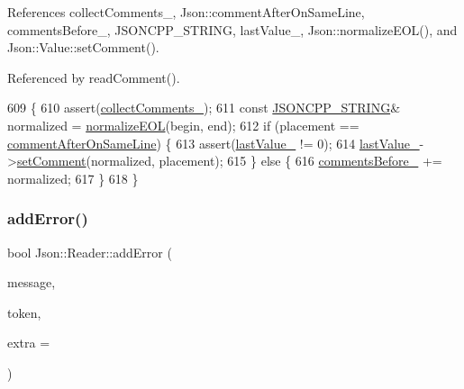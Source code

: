 References collect\+Comments\+\_\+, Json\+::comment\+After\+On\+Same\+Line, comments\+Before\+\_\+, J\+S\+O\+N\+C\+P\+P\+\_\+\+S\+T\+R\+I\+NG, last\+Value\+\_\+, Json\+::normalize\+E\+O\+L(), and Json\+::\+Value\+::set\+Comment().



Referenced by read\+Comment().


\begin{DoxyCode}
609                                                                            \{
610   assert(\hyperlink{class_json_1_1_reader_a8e9ce743f6004f0596692f0a9ee4626c}{collectComments\_});
611   \textcolor{keyword}{const} \hyperlink{json_8h_a1e723f95759de062585bc4a8fd3fa4be}{JSONCPP\_STRING}& normalized = \hyperlink{namespace_json_a63123f3dd63f340ac517a59f44ea7aa4}{normalizeEOL}(begin, end);
612   \textcolor{keywordflow}{if} (placement == \hyperlink{namespace_json_a4fc417c23905b2ae9e2c47d197a45351a008a230a0586de54f30b76afe70fdcfa}{commentAfterOnSameLine}) \{
613     assert(\hyperlink{class_json_1_1_reader_a87cc75ae5adc6a6755f0ba1c7255ff6c}{lastValue\_} != 0);
614     \hyperlink{class_json_1_1_reader_a87cc75ae5adc6a6755f0ba1c7255ff6c}{lastValue\_}->\hyperlink{class_json_1_1_value_a29f3a30f7e5d3af6f38d57999bf5b480}{setComment}(normalized, placement);
615   \} \textcolor{keywordflow}{else} \{
616     \hyperlink{class_json_1_1_reader_af777967adaf0b2e882efa07673754381}{commentsBefore\_} += normalized;
617   \}
618 \}
\end{DoxyCode}
\mbox{\label{class_json_1_1_reader_af02176a1d2786b4415bbb00a1b10bb6b}} 
\subsubsection{\texorpdfstring{add\+Error()}{addError()}}
{\footnotesize\ttfamily bool Json\+::\+Reader\+::add\+Error (\begin{DoxyParamCaption}\item[{const \hyperlink{json_8h_a1e723f95759de062585bc4a8fd3fa4be}{J\+S\+O\+N\+C\+P\+P\+\_\+\+S\+T\+R\+I\+NG} \&}]{message,  }\item[{\hyperlink{class_json_1_1_reader_1_1_token}{Token} \&}]{token,  }\item[{\hyperlink{class_json_1_1_reader_a46795b5b272bf79a7730e406cb96375a}{Location}}]{extra = {} }\end{DoxyParamCaption})\hspace{0.3cm}{\ttfamily [private]}}



